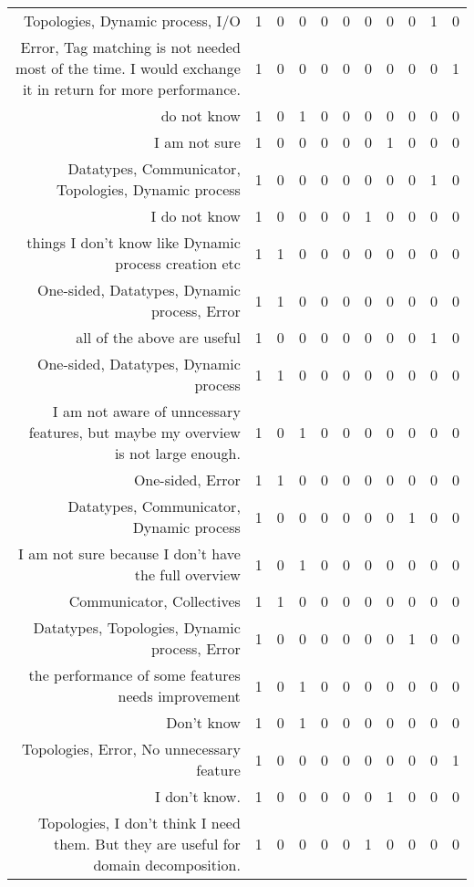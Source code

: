 {\begin{landscape}
\begin{longtable}[htb]{r|c|c|c|c|c|c|c|c|c|c}
{Topologies, Dynamic process, I/O} & 1 & 0 & 0 & 0 & 0 & 0 & 0 & 0 & 1 & 0 \\%
{Error, Tag matching is not needed most of the time. I would exchange it in return for more performance.} & 1 & 0 & 0 & 0 & 0 & 0 & 0 & 0 & 0 & 1 \\%
{do not know} & 1 & 0 & 1 & 0 & 0 & 0 & 0 & 0 & 0 & 0 \\%
{I am not sure} & 1 & 0 & 0 & 0 & 0 & 0 & 1 & 0 & 0 & 0 \\%
{Datatypes, Communicator, Topologies, Dynamic process} & 1 & 0 & 0 & 0 & 0 & 0 & 0 & 0 & 1 & 0 \\%
{I do not know} & 1 & 0 & 0 & 0 & 0 & 1 & 0 & 0 & 0 & 0 \\%
{things I don't know like Dynamic process creation etc} & 1 & 1 & 0 & 0 & 0 & 0 & 0 & 0 & 0 & 0 \\%
{One-sided, Datatypes, Dynamic process, Error} & 1 & 1 & 0 & 0 & 0 & 0 & 0 & 0 & 0 & 0 \\%
{all of the above are useful} & 1 & 0 & 0 & 0 & 0 & 0 & 0 & 0 & 1 & 0 \\%
{One-sided, Datatypes, Dynamic process} & 1 & 1 & 0 & 0 & 0 & 0 & 0 & 0 & 0 & 0 \\%
{I am not aware of unncessary features, but maybe my overview is not large enough.} & 1 & 0 & 1 & 0 & 0 & 0 & 0 & 0 & 0 & 0 \\%
{One-sided, Error} & 1 & 1 & 0 & 0 & 0 & 0 & 0 & 0 & 0 & 0 \\%
{Datatypes, Communicator, Dynamic process} & 1 & 0 & 0 & 0 & 0 & 0 & 0 & 1 & 0 & 0 \\%
{I am not sure because I don't have the full overview} & 1 & 0 & 1 & 0 & 0 & 0 & 0 & 0 & 0 & 0 \\%
{Communicator, Collectives} & 1 & 1 & 0 & 0 & 0 & 0 & 0 & 0 & 0 & 0 \\%
{Datatypes, Topologies, Dynamic process, Error} & 1 & 0 & 0 & 0 & 0 & 0 & 0 & 1 & 0 & 0 \\%
{the performance of some features needs improvement} & 1 & 0 & 1 & 0 & 0 & 0 & 0 & 0 & 0 & 0 \\%
{Don't know} & 1 & 0 & 1 & 0 & 0 & 0 & 0 & 0 & 0 & 0 \\%
{Topologies, Error, No unnecessary feature} & 1 & 0 & 0 & 0 & 0 & 0 & 0 & 0 & 0 & 1 \\%
{I don't know.} & 1 & 0 & 0 & 0 & 0 & 0 & 1 & 0 & 0 & 0 \\%
{Topologies, I don't think I need them. But they are useful for domain decomposition.} & 1 & 0 & 0 & 0 & 0 & 1 & 0 & 0 & 0 & 0 \\%

\end{longtable}
\end{landscape}}
